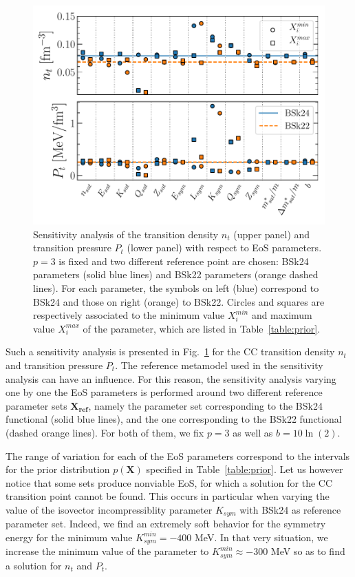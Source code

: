 \begin{figure}[!t]
\begin{center}
  \includegraphics[width=0.9\linewidth]{figures/sensana.pdf}
\end{center}
\caption[Sensitivity analysis of the crust-core transition point for
BSk24 and BSk22]{Sensitivity analysis of the transition density $n_t$ (upper 
panel) and transition pressure $P_t$ (lower panel) with respect to EoS 
parameters. $p=3$ is fixed and two different reference point are chosen:
BSk24 parameters (solid blue lines) and BSk22 parameters (orange 
dashed lines). For each parameter, the symbols on left (blue) correspond to 
BSk24 and those on right (orange) to BSk22. Circles and squares are
respectively associated to the minimum value $X_i^{min}$ and maximum value
$X_i^{max}$ of the parameter, which are listed in 
Table~\ref{table:prior}.}\label{fig:sensana}
\end{figure}
 
Such a sensitivity analysis is presented in Fig.~\ref{fig:sensana} for the 
CC transition density $n_t$ and transition pressure $P_t$. The reference 
metamodel used in the sensitivity analysis can have an influence. For this 
reason, the sensitivity analysis varying one by one the EoS parameters is 
performed around two different reference parameter sets $\bm{X_{ref}}$, namely 
the parameter set corresponding to the BSk24 functional (solid blue lines), and 
the one corresponding to the BSk22 functional (dashed orange lines). For both 
of them, we fix $p=3$ as well as $b=10\ln(2)$.

The range of variation for each of the EoS parameters 
correspond to the intervals for the prior distribution $p(\bm{X})$ specified in 
Table~\ref{table:prior}. Let us however notice that some sets produce nonviable 
EoS, for which a solution for the CC transition point cannot be found. This
occurs in particular when varying the value of the isovector incompressiblity 
parameter $K_{sym}$ with BSk24 as reference parameter set. Indeed, we find 
an extremely soft behavior for the symmetry energy for the minimum value 
$K_{sym}^{min}=-400$ MeV. In that very situation, we increase the minimum value 
of the parameter to $K_{sym}^{min} \approx -300$ MeV so as to find a solution 
for $n_t$ and $P_t$.

